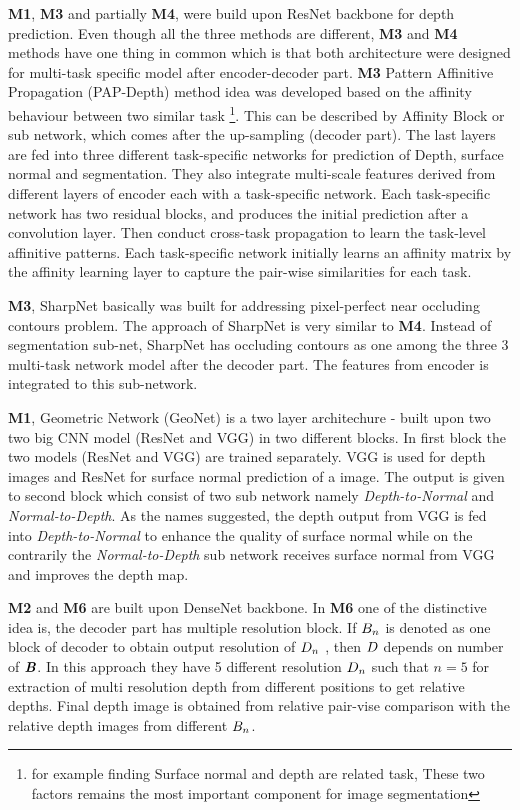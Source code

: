 \textbf{M1}, \textbf{M3} and partially \textbf{M4}, were build upon ResNet backbone for depth prediction. Even though all the three methods are different, \textbf{M3} and \textbf{M4} methods have one thing in common which is that both architecture were designed for multi-task specific model after encoder-decoder part. \textbf{M3} Pattern Affinitive Propagation (PAP-Depth) method idea was developed based on the affinity behaviour between two similar task \footnote{for example finding Surface normal and depth are related task, These two factors remains the  most important component for image segmentation}. This can be described by Affinity Block or sub network, which comes after the up-sampling (decoder part). The last layers are fed into three different task-specific networks for prediction of Depth, surface normal and segmentation. They also integrate multi-scale features derived from different layers of encoder each with a task-specific network. Each task-specific network has two residual blocks, and produces the initial prediction after a convolution layer. Then conduct cross-task propagation to learn the task-level affinitive patterns. Each task-specific network initially learns an affinity matrix by the affinity learning layer to capture the pair-wise similarities for each task.

\textbf{M3}, SharpNet basically was built for addressing pixel-perfect near occluding contours  problem. The approach of SharpNet is very similar to \textbf{M4}. Instead of segmentation sub-net, SharpNet has occluding contours as one among the three 3 multi-task network model after the decoder part. The features from encoder is integrated to this sub-network. 

\textbf{M1}, Geometric Network (GeoNet) is a two layer architechure - built upon two two big CNN model (ResNet and VGG) in two different blocks. In first block the two models (ResNet and VGG) are trained separately. VGG is used for depth images and ResNet for surface normal prediction of a image. The output is given to second block which consist of two sub network namely \textit{Depth-to-Normal} and \textit{Normal-to-Depth}. As the names suggested, the depth output from VGG is fed into \textit{Depth-to-Normal} to enhance the quality of surface normal while on the contrarily the \textit{Normal-to-Depth} sub network receives surface normal from VGG and improves the depth map.


\textbf{M2} and \textbf{M6} are built upon DenseNet backbone. In \textbf{M6} one of the distinctive idea is, the decoder part has multiple resolution block. If \(\textbf{\textit{$B_n$}}\) is denoted as one block of decoder to obtain output resolution of \(\textbf{\textit{$D_n$}}\) , then  \(\textbf{\textit{$D$}}\) depends on number of  \(\textbf{\textit{B}}\). In this approach they have 5 different resolution \(\textbf{\textit{$D_n$}}\)  such that \(n = 5\) for extraction of multi resolution depth from different positions to get relative depths. Final depth image is obtained from relative pair-vise comparison with the relative depth images from different \(\textbf{\textit{$B_n$}}\).

